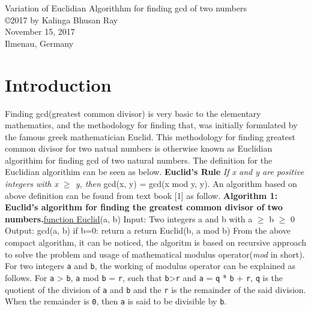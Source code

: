 \documentclass[12pt]{article}
\begin{document}
\begin{center}
{\large Variation of Euclidian Algorithhm for finding gcd of two numbers} \\
\copyright 2017 by Kalinga Bhusan Ray \\
November 15, 2017 \\
Ilmenau, Germany \\
\author{Kalinga Bhusan Ray}
\end{center}

\section{Introduction}
Finding gcd(greatest common divisor) is very basic to the elementary mathematics, 
and the methodology for finding that, was initially formulated by the famous greek mathematician Euclid. This methodology for finding greatest common divisor for two natual numbers is otherwise known as Euclidian algorithim for finding gcd of two 
natural numbers. The definition for the Euclidian algorithim can be seen as below.
\newline \newline \textbf {Euclid's Rule} \textit {If x and y are positive integers with x $\geq$ y,
 then} \break \vspace{0mm} \hspace{4cm} gcd(x, y) = gcd(x mod y, y).
\newline 
\newline An algorithm based on above definition can be found from text book [1] as follow.
\newline \textbf{Algorithm 1:}
\newline \textbf {Euclid's algorithm for finding the greatest common divisor of two numbers.}\newline \underline {function Euclid}(a, b)
\newline Input: Two integers a and b with a $\geq$ b $\geq$ 0 
\newline Output: gcd(a, b)
\newline
\newline if b=0: return a
\newline return Euclid(b, a mod b)
\newline 
\newline From the above compact algorithm, it can be noticed, the algoritm is based on recursive approach to solve the problem and usage of mathematical modulus operator(\textit {mod} in short).
For two integers \texttt{a} and \texttt{b}, the working of modulus operator can be explained as follows.
For \texttt{a} > \texttt{b}, \texttt{a} mod \texttt{b} = \texttt{r},  such that \texttt{b}>\texttt{r} and  \texttt{a} = \texttt{q} * \texttt{b} + \texttt{r}, \texttt{q} is the quotient of the division of \texttt{a} and \texttt{b} and the \texttt{r} is the remainder of the said division. When the remainder is \texttt{0}, then \texttt{a} is said to be divisible by \texttt{b}.
\end{document}
